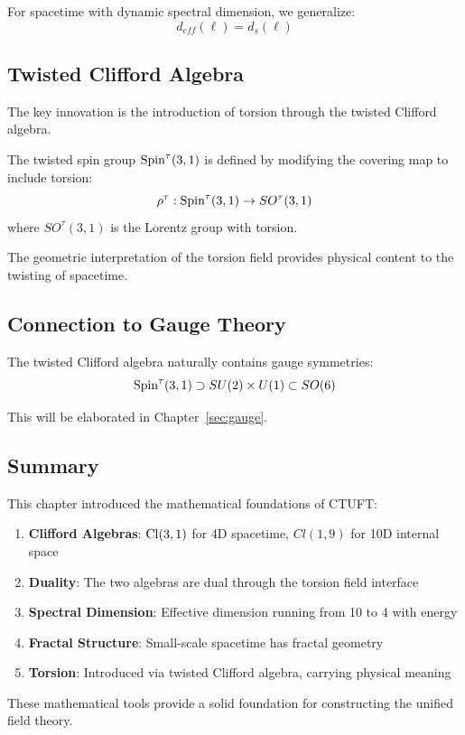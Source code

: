 For spacetime with dynamic spectral dimension, we generalize:
\begin{equation}
    d_{eff}(\ell) = d_s(\ell)
\end{equation}

\subsection{Twisted Clifford Algebra}

The key innovation is the introduction of torsion through the twisted Clifford algebra.

\begin{definition}
The twisted spin group $\mathrm{Spin}^\tau(3,1)$ is defined by modifying the covering map to include torsion:
\begin{equation}
    \rho^\tau: \mathrm{Spin}^\tau(3,1) \to SO^\tau(3,1)
\end{equation}
where $SO^\tau(3,1)$ is the Lorentz group with torsion.
\end{definition}

The geometric interpretation of the torsion field provides physical content to the twisting of spacetime.

\subsection{Connection to Gauge Theory}

The twisted Clifford algebra naturally contains gauge symmetries:
\begin{equation}
    \mathrm{Spin}^\tau(3,1) \supset SU(2) \times U(1) \subset SO(6)
\end{equation}

This will be elaborated in Chapter~\ref{sec:gauge}.

\subsection{Summary}

This chapter introduced the mathematical foundations of CTUFT:
\begin{enumerate}
    \item \textbf{Clifford Algebras}: $\mathrm{Cl}(3,1)$ for 4D spacetime, $Cl(1,9)$ for 10D internal space
    \item \textbf{Duality}: The two algebras are dual through the torsion field interface
    \item \textbf{Spectral Dimension}: Effective dimension running from 10 to 4 with energy
    \item \textbf{Fractal Structure}: Small-scale spacetime has fractal geometry
    \item \textbf{Torsion}: Introduced via twisted Clifford algebra, carrying physical meaning
\end{enumerate}

These mathematical tools provide a solid foundation for constructing the unified field theory.
